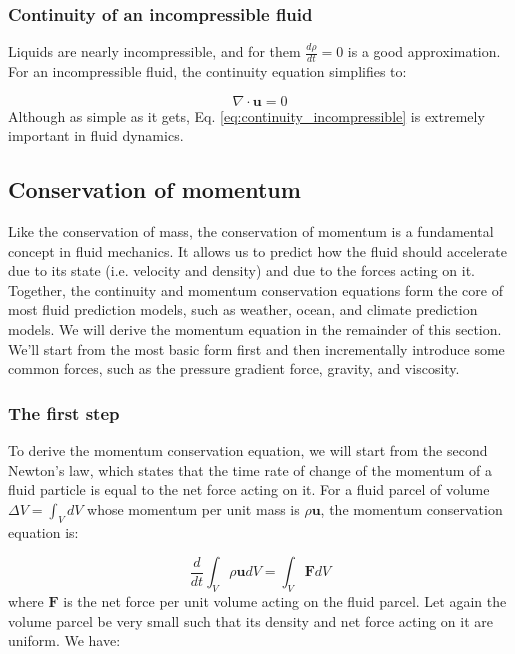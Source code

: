 \documentclass[12pt]{article}
\numberwithin{equation}{section}
\numberwithin{figure}{section}
\numberwithin{table}{section}
\begin{document}
\subsubsection{Continuity of an incompressible fluid}

Liquids are nearly incompressible, and for them $\frac{d\rho}{dt} = 0$ is a good
approximation.
For an incompressible fluid, the continuity equation simplifies to:

\begin{equation}
  \nabla \cdot \mathbf{u} = 0
  \label{eq:continuity_incompressible}
\end{equation}
Although as simple as it gets, Eq. \ref{eq:continuity_incompressible} is
extremely important in fluid dynamics.

\subsection{Conservation of momentum}

Like the conservation of mass, the conservation of momentum is a fundamental
concept in fluid mechanics.
It allows us to predict how the fluid should accelerate due to its state
(i.e. velocity and density) and due to the forces acting on it.
Together, the continuity and momentum conservation
equations form the core of most fluid prediction models, such as weather, ocean,
and climate prediction models.
We will derive the momentum equation in the remainder of this section.
We'll start from the most basic form first and then incrementally introduce
some common forces, such as the pressure gradient force, gravity, and viscosity.

\subsubsection{The first step}

To derive the momentum conservation equation, we will start from the second
Newton's law, which states that the time rate of change of the momentum of a
fluid particle is equal to the net force acting on it.
For a fluid parcel of volume $\Delta V = \int_V dV$ whose momentum per unit mass
is $\rho \mathbf{u}$, the momentum conservation equation is:

\begin{equation}
  \frac{d}{dt} \int_V \rho \mathbf{u} dV = \int_V \mathbf{F} dV
\end{equation}
where $\mathbf{F}$ is the net force per unit volume acting on the fluid parcel.
Let again the volume parcel be very small such that its density and net force
acting on it are uniform. We have:
\end{document}
